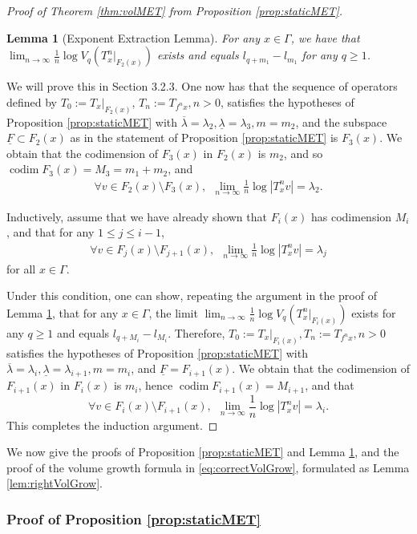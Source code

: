 \documentclass[11pt]{amsart}
\theoremstyle{theorem}
\newtheorem{lem}[thm]{Lemma}
\theoremstyle{definition}
\numberwithin{equation}{section}
\renewcommand{\l}{\lambda}
\newcommand{\ol}{\overline{\lambda}}
\newcommand{\ul}{\underline{\lambda}}
\newcommand{\codim}{\operatorname{codim}}
\begin{document}
\begin{proof}[Proof of Theorem \ref{thm:volMET} from Proposition \ref{prop:staticMET}]
\begin{lem}[Exponent Extraction Lemma] \label{lem:lyapInduct}
For any $x \in \Gamma$, we have that $\lim_{n \to \infty} \frac{1}{n} \log V_q(T^n_x|_{F_2(x)})$ exists and equals $l_{q + m_1} - l_{m_1}$ for any $q \geq 1$.
\end{lem}
We will prove this in Section 3.2.3. One now has that the sequence of operators defined by $T_0 := T_x|_{F_2(x)}$, $T_n := T_{f^n x}, n > 0$, satisfies the hypotheses of Proposition \ref{prop:staticMET} with $\ol = \l_2, \ul = \l_3, m = m_2$, and the subspace $\underline{F} \subset F_2(x)$ as in the statement of Proposition \ref{prop:staticMET} is $F_3(x)$. We obtain that the codimension of $F_3(x)$ in $F_2(x)$ is $m_2$, and so $\codim F_3(x) = M_3 = m_1 + m_2$, and
\begin{gather*}
\forall v \in F_2(x) \setminus F_3(x), ~~ \lim_{n \to \infty} \frac{1}{n} \log |T^n_x v| = \l_2.
\end{gather*}

Inductively, assume that we have already shown that $F_i(x)$ has codimension $M_i$, and that for any $1 \leq j \leq i - 1$,
\begin{gather*}
\forall v \in F_j(x) \setminus F_{j + 1}(x), ~~ \lim_{n \to \infty} \frac{1}{n} \log |T^n_x v| = \l_j
\end{gather*}
for all $x \in \Gamma$.

Under this condition, one can show, repeating the argument in the proof of Lemma \ref{lem:lyapInduct}, that for any $x \in \Gamma$, the limit $\lim_{n \to \infty} \frac{1}{n} \log V_q(T^n_x|_{F_i(x)})$ exists for any $q \geq 1$ and equals $l_{q + M_i} - l_{M_i}$. Therefore, $T_0 := T_x|_{F_i(x)}, T_n := T_{f^n x}, n > 0 $ satisfies the hypotheses of Proposition \ref{prop:staticMET} with $\ol = \l_i, \ul = \l_{i  +1}, m = m_i$, and $\underline{F} = F_{i + 1}(x)$. We obtain that the codimension of $F_{i + 1}(x)$ in $F_i(x)$ is $m_i$, hence $\codim F_{i + 1}(x) = M_{i + 1}$, and that
\[
\forall v \in F_{i}(x) \setminus F_{i+ 1}(x), ~~ \lim_{n \to \infty} \frac{1}{n} \log |T^n_x v| = \l_i.
\]
This completes the induction argument.
\end{proof}

We now give the proofs of Proposition \ref{prop:staticMET} and Lemma \ref{lem:lyapInduct}, and the proof of the volume growth formula in \eqref{eq:correctVolGrow}, formulated as Lemma \ref{lem:rightVolGrow}.

\subsubsection{Proof of Proposition \ref{prop:staticMET}}
\end{document}
